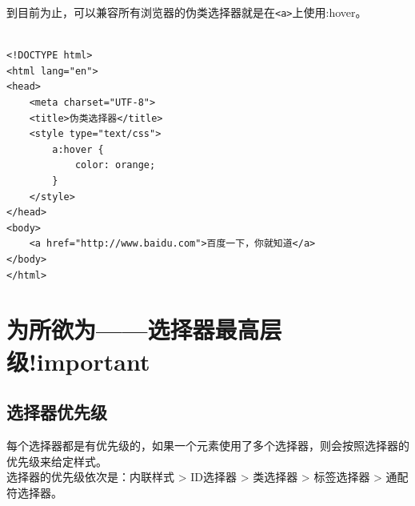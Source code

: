 \begin{table}[H]
    \centering
    \caption{常用伪类选择器}
\end{table}

到目前为止，可以兼容所有浏览器的伪类选择器就是在\lstinline|<a>|上使用:hover。 \\

 \\
\begin{lstlisting}[style=htmlcssjs]
<!DOCTYPE html>
<html lang="en">
<head>
    <meta charset="UTF-8">
    <title>伪类选择器</title>
    <style type="text/css">
        a:hover {
            color: orange;
        }
    </style>
</head>
<body>
    <a href="http://www.baidu.com">百度一下，你就知道</a>
</body>
</html>
\end{lstlisting}

\newpage

\section{为所欲为——选择器最高层级!important}

\subsection{选择器优先级}

每个选择器都是有优先级的，如果一个元素使用了多个选择器，则会按照选择器的优先级来给定样式。 \\

选择器的优先级依次是：内联样式 > ID选择器 > 类选择器 > 标签选择器 > 通配符选择器。


